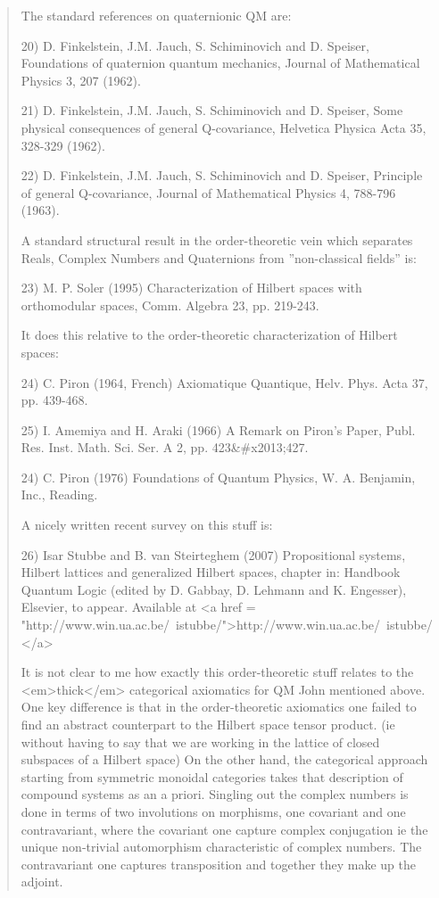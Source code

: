 \begin{quote}
The standard references on quaternionic QM are:

20) D. Finkelstein, J.M. Jauch, S. Schiminovich and D. Speiser, Foundations of 
quaternion quantum mechanics, Journal of Mathematical Physics 3, 207 (1962).

21)
D. Finkelstein, J.M. Jauch, S. Schiminovich and D. Speiser, Some physical consequences of general Q-covariance, Helvetica Physica Acta 35, 328-329 (1962).

22) D. Finkelstein, J.M. Jauch, S. Schiminovich and D. Speiser, Principle of 
general Q-covariance, Journal of Mathematical Physics 4, 788-796 (1963).

A standard structural result in the order-theoretic vein which separates Reals, Complex Numbers and Quaternions from ''non-classical fields'' is:

23) M. P. Soler (1995) Characterization of Hilbert spaces with orthomodular 
spaces, Comm. Algebra 23, pp. 219-243.

It does this relative to the order-theoretic characterization of Hilbert 
spaces:

24) C.  Piron (1964, French) Axiomatique Quantique, Helv. Phys. Acta 37, 
pp. 439-468. 

25) I. Amemiya and H. Araki (1966) A Remark on Piron's Paper, Publ. Res. Inst. Math. Sci. Ser. A 2, pp. 423&#x2013;427. 

24) C. Piron (1976) Foundations of Quantum Physics, W. A. Benjamin, Inc., 
Reading. 

A nicely written recent survey on this stuff is:

26) Isar Stubbe and B. van Steirteghem (2007) Propositional systems,
Hilbert lattices and generalized Hilbert spaces, chapter in: Handbook
Quantum Logic (edited by D. Gabbay, D. Lehmann and K. Engesser),
Elsevier, to appear.  Available at <a href =
"http://www.win.ua.ac.be/~istubbe/">http://www.win.ua.ac.be/~istubbe/</a>

It is not clear to me how exactly this order-theoretic stuff relates
to the <em>thick</em> categorical axiomatics for QM John mentioned
above.  One key difference is that in the order-theoretic axiomatics
one failed to find an abstract counterpart to the Hilbert space tensor
product.  (ie without having to say that we are working in the lattice
of closed subspaces of a Hilbert space) On the other hand, the
categorical approach starting from symmetric monoidal categories takes
that description of compound systems as an a priori.  Singling out the
complex numbers is done in terms of two involutions on morphisms, one
covariant and one contravariant, where the covariant one capture
complex conjugation ie the unique non-trivial automorphism
characteristic of complex numbers.  The contravariant one captures
transposition and together they make up the adjoint.

\end{quote}
    

